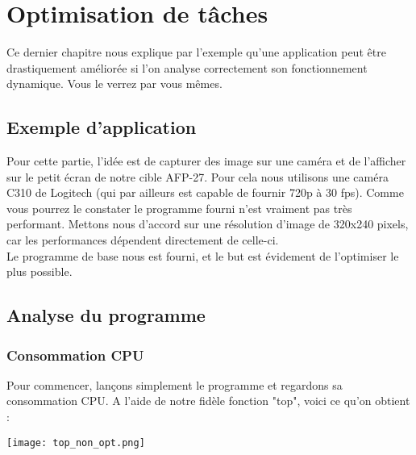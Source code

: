 
\chapter{Optimisation de tâches} %

\label{Chapitre 4} %


Ce dernier chapitre nous explique par l'exemple qu'une application peut être drastiquement améliorée si l'on analyse correctement son fonctionnement dynamique. Vous le verrez par vous mêmes. 

\section{Exemple d'application}
Pour cette partie, l'idée est de capturer des image sur une caméra et de l'afficher sur le petit écran de notre cible  AFP-27. Pour cela nous utilisons une caméra C310 de Logitech (qui par ailleurs est capable de fournir 720p à 30 fps). Comme vous pourrez le constater le programme fourni n'est vraiment pas très performant. Mettons nous d'accord sur une résolution d'image de 320x240 pixels, car les performances dépendent directement de celle-ci.\\

Le programme de base nous est fourni, et le but est évidement de l'optimiser le plus possible.

\pagebreak \section{Analyse du programme}

\subsection{Consommation CPU}
Pour commencer, lançons simplement le programme et regardons sa consommation CPU. A l'aide de notre fidèle fonction "top", voici ce qu'on obtient :
\begin{center} 
\hspace{12.45cm}
\texttt{[image: top\_non\_opt.png]}
\end{center}
\vspace{0.5cm}

